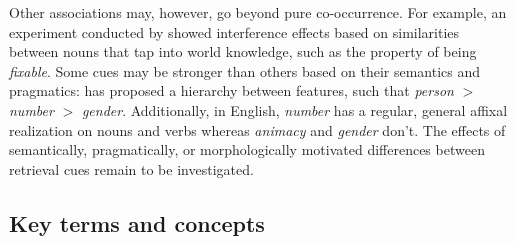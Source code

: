 \documentclass{cambridge7A}\usepackage[]{graphicx}\usepackage[]{color}
\begin{document}
Other associations may, however, go beyond pure co-occurrence. 
For example, an experiment conducted by \cite{VanDyke2006} showed interference effects based on similarities between nouns that tap into world knowledge, such as the property of being \textit{fixable}. Some cues may be stronger than others based on their semantics and pragmatics: \cite{CarminatiNella2005} has proposed a hierarchy between features, such that \textit{person} $>$ \textit{number} $>$ \textit{gender}.
Additionally, in English, \textit{number} has a regular, general affixal realization on nouns and verbs whereas \textit{animacy} and \textit{gender} don't. The effects of semantically, pragmatically, or morphologically motivated differences between retrieval cues remain to be investigated.

\newpage

\begin{subappendices}
\section{Key terms and concepts}


\end{subappendices}
\end{document}

